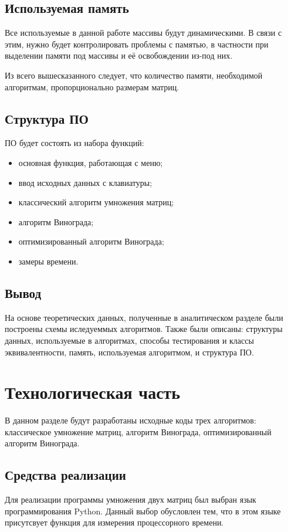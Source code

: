 \documentclass[12pt]{report}
\begin{document}
	\section{Используемая память}
	Все используемые в данной работе массивы будут динамическими. В связи с этим, нужно будет контролировать проблемы с памятью, в частности при выделении памяти под массивы и её освобождении из-под них.
	
	Из всего вышесказанного следует, что количество памяти, необходимой алгоритмам, пропорционально размерам матриц.
	
	\section{Структура ПО}
	ПО будет состоять из набора функций:
	
	\begin{itemize}
		\item основная функция, работающая с меню;
		\item ввод исходных данных с клавиатуры;
		\item классический алгоритм умножения матриц;
		\item алгоритм Винограда;
		\item оптимизированный алгоритм Винограда;
		\item замеры времени.
	\end{itemize}
	
	\section{Вывод}
	На основе теоретических данных, полученные в аналитическом разделе были построены схемы иследуеммых  алгоритмов. Также были описаны: структуры данных, используемые в алгоритмах, способы тестирования и классы эквивалентности, память, используемая алгоритмом, и структура ПО.
	
	\chapter{Технологическая часть}
	
	В данном разделе будут разработаны исходные коды трех алгоритмов: классическое умножение матриц, алгоритм Винограда, оптимизированный алгоритм Винограда.
	
	\section{Средства реализации}
	Для реализации программы умножения двух матриц был выбран язык программирования Python. Данный выбор обусловлен тем,  что в этом языке присутсвует функция для измерения процессорного времени.
	
\end{document}
